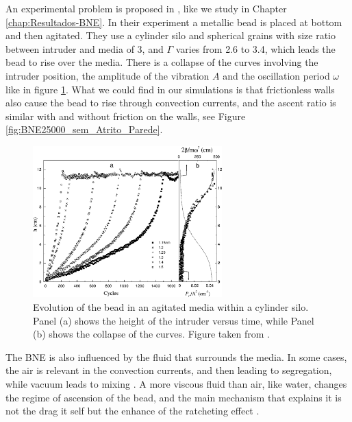     An experimental problem is proposed in \cite{Inertia_in_the_Brazil_nut_problem}, like we study in Chapter \ref{chap:Resultados-BNE}. In their experiment a metallic bead is placed at bottom and then agitated. They use a cylinder silo and spherical grains with size ratio between intruder and media of 3, and $\Gamma$ varies from 2.6 to 3.4, which leads the bead to rise over the media. There is a collapse of the curves involving the intruder position, the amplitude of the vibration $A$ and the oscillation period $\omega$ like in figure \ref{fig:BNE_molinari}. What we could find in our simulations is that frictionless walls also cause the bead to rise through convection currents, and the ascent ratio is similar with and without friction on the walls, see Figure \ref{fig:BNE25000_sem_Atrito_Parede}. %

\begin{figure}
    \centering
    \includegraphics[width=0.65\textwidth]{04-figuras/BNE_Molinari.png}
    \caption[Intruder height in an agitated media.]{Evolution of the bead in an agitated media within a cylinder silo. Panel (a) shows the height of the intruder versus time, while Panel (b) shows the collapse of the curves. Figure taken from \cite{Inertia_in_the_Brazil_nut_problem}.}
    \label{fig:BNE_molinari}
\end{figure}

    The BNE is also influenced by the fluid that surrounds the media. In some cases, the air is relevant in the convection currents, and then leading to segregation, while vacuum leads to mixing \cite{Brazil-Nut_effect_Size_separation_of_granular_particles, Inertia_in_the_Brazil_nut_problem}. A more viscous fluid than air, like water, changes the regime of ascension of the bead, and the main mechanism that explains it is not the drag it self but the enhance of the ratcheting effect \cite{The_water-enhance_Brazil_nut_effect}.

